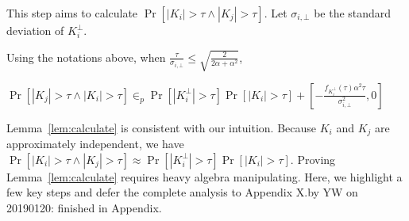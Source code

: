  This step aims to calculate $\Pr[|K_i| > \tau \wedge |K_j| > \tau]$. Let $\sigma_{i, \bot}$ be the standard deviation of $K^{\bot}_i$. 

\begin{lemma}\label{lem:calculate} Using the notations above, when $\frac{\tau}{\sigma_{i,\bot}} \leq \sqrt{\frac{2}{2\alpha + \alpha^2}}$,


$    \Pr\left[|K_j |>\tau \wedge | K_i | > \tau \right]
   \in_p 
   \Pr[|K^{\bot}_i| > \tau ]\Pr[|K_i| > \tau ] + \left[-\frac{f_{K^{\bot}_i}(\tau )\alpha^2 \tau}{\sigma^2_{i,\bot}}, 0 \right]
$
\end{lemma}


Lemma~\ref{lem:calculate} is consistent with our intuition. Because $K_i$ and $K_j$ are approximately independent, we have $\Pr[|K_i| > \tau \wedge |K_j| > \tau] \approx \Pr[|K^{\bot}_i| > \tau ]\Pr[|K_i| > \tau]$. Proving Lemma~\ref{lem:calculate} requires heavy algebra manipulating. Here, we highlight a few key steps and defer the complete analysis to {\color{red} Appendix X.}{\color{blue}by YW on 20190120: finished in Appendix.} 

